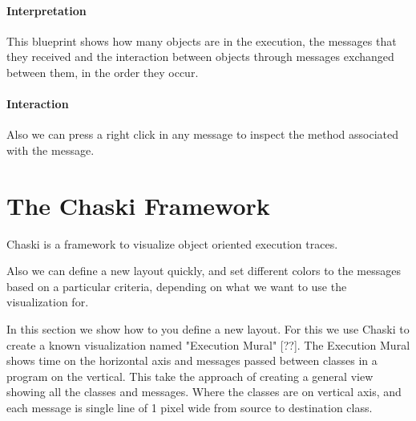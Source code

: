 \documentclass{sig-alternate}
\newcommand{\seclabel}[1]{\label{sec:#1}}
\begin{document}
\paragraph{Interpretation}

This blueprint shows how many objects are in the execution, the messages that they received and the interaction between objects through messages exchanged between them, in the order they occur.

\paragraph{Interaction}

Also we can press a right click in any message to inspect the method associated with the message.



\section{The Chaski Framework}\seclabel{framework}

Chaski is a framework to visualize object oriented execution traces. 

Also we can define a new layout quickly, and set different colors to the messages based on a particular criteria, depending on what we want to use the visualization for.


In this section we show how to you define a new layout. For this we use Chaski to create a known visualization named "Execution Mural" [??]. The Execution Mural shows time on the horizontal axis and messages passed between classes in a program on the vertical. This take the approach of creating a general view showing all the classes and messages. Where the classes are on vertical axis, and each message is single line of 1 pixel wide from source to destination class.
\end{document}
